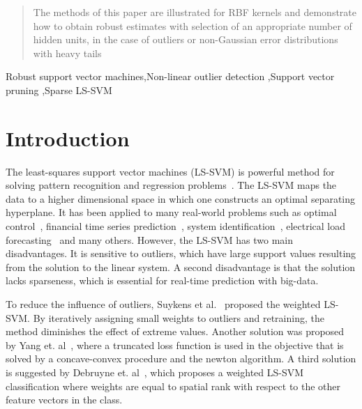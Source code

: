 \documentclass[preprint,12pt]{elsarticle}
\begin{document}
\begin{frontmatter}
\begin{abstract}
			The methods of this paper are illustrated for RBF kernels and demonstrate how to obtain
			robust estimates with selection of an appropriate number of hidden units, in the case of
			outliers or non-Gaussian error distributions with heavy tails
			
		\end{abstract}
		
		\begin{keyword}
			Robust support vector machines\sep Non-linear outlier detection \sep Support vector pruning \sep Sparse LS-SVM 
		\end{keyword}
	\end{frontmatter}
	
	
	\section{Introduction}
	
	The least-squares support vector machines (LS-SVM) is powerful method for solving pattern recognition and regression problems~\cite{suykens2002least}. The LS-SVM maps the data to a higher dimensional space in which one constructs an optimal separating hyperplane. It has been applied to many real-world problems such as optimal control~\cite{suykens2001optimal}, financial time series prediction~\cite{van2001financial}, system identification~\cite{goethals2005identification}, electrical load forecasting~\cite{espinoza2006fixed} and many others. However, the LS-SVM has two main disadvantages. It is sensitive to outliers, which have large support values resulting from the solution to the linear system. A second disadvantage is that the solution lacks sparseness, which is essential for real-time prediction with big-data.
	
	To reduce the influence of outliers, Suykens et al.~\cite{suykens2002weighted} proposed the weighted LS-SVM. By iteratively assigning small weights to outliers and retraining, the method diminishes the effect of extreme values. Another solution was proposed by Yang et. al~\cite{yang2014robust}, where a truncated loss function is used in the objective that is solved by a concave-convex procedure and the newton algorithm. A third solution is suggested by Debruyne et. al~\cite{debruyne2009robustified}, which proposes a weighted LS-SVM classification where weights are equal to spatial rank with respect to the other feature vectors in the class.
	
\end{document}
